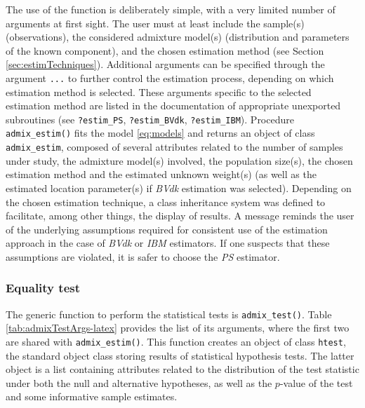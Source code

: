 The use of the function is deliberately simple, with a very limited number of arguments at first sight. The user must at least include the sample(s) (observations), the considered admixture model(s) (distribution and parameters of the known component), and the chosen estimation method (see Section \ref{sec:estimTechniques}). Additional arguments can be specified through the argument \texttt{...} to further control the estimation process, depending on which estimation method is selected. These arguments specific to the selected estimation method are listed in the documentation of appropriate unexported subroutines (see \texttt{?estim\_PS}, \texttt{?estim\_BVdk}, \texttt{?estim\_IBM}). Procedure \texttt{admix\_estim()} fits the model \eqref{eq:models} and returns an object of class \texttt{admix\_estim}, composed of several attributes related to the number of samples under study, the admixture model(s) involved, the population size(s), the chosen estimation method and the estimated unknown weight(s) (as well as the estimated location parameter(s) if \emph{BVdk} estimation was selected). Depending on the chosen estimation technique, a class inheritance system was defined to facilitate, among other things, the display of results. A message reminds the user of the underlying assumptions required for consistent use of the estimation approach in the case of \emph{BVdk} or \emph{IBM} estimators. If one suspects that these assumptions are violated, it is safer to choose the \emph{PS} estimator.

\subsubsection{Equality test}\label{equality-test}

The generic function to perform the statistical tests is \texttt{admix\_test()}. Table \ref{tab:admixTestArgs-latex} provides the list of its arguments, where the first two are shared with \texttt{admix\_estim()}. This function creates an object of class \texttt{htest}, the standard object class storing results of statistical hypothesis tests. The latter object is a list containing attributes related to the distribution of the test statistic under both the null and alternative hypotheses, as well as the \(p\)-value of the test and some informative sample estimates.


